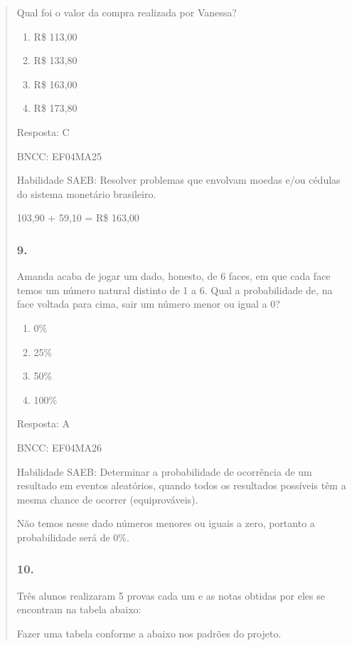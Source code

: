 \begin{enumerate}
\begin{escolha}
\begin{enumerate}
\begin{itemize}
\begin{itemize}
\begin{escolha}
\begin{quote}
\begin{escolha}
{Qual foi o valor da compra realizada por Vanessa?

\begin{enumerate}
\def\labelenumi{\alph{enumi})}
\item
  R\$ 113,00
\item
  R\$ 133,80
\item
  R\$ 163,00
\item
  R\$ 173,80
\end{enumerate}

Resposta: C

BNCC: EF04MA25

Habilidade SAEB: Resolver problemas que envolvam moedas e/ou cédulas do
sistema monetário brasileiro.

103,90 + 59,10 = R\$ 163,00

\subsubsection{9.}\label{section-165}

Amanda acaba de jogar um dado, honesto, de 6 faces, em que cada face
temos um número natural distinto de 1 a 6. Qual a probabilidade de, na
face voltada para cima, sair um número menor ou igual a 0?

\begin{enumerate}
\def\labelenumi{\alph{enumi})}
\item
  0\%
\item
  25\%
\item
  50\%
\item
  100\%
\end{enumerate}

Resposta: A

BNCC: EF04MA26

Habilidade SAEB: Determinar a probabilidade de ocorrência de um
resultado em eventos aleatórios, quando todos os resultados possíveis
têm a mesma chance de ocorrer (equiprováveis).

Não temos nesse dado números menores ou iguais a zero, portanto a
probabilidade será de 0\%.

\subsubsection{10.}\label{section-166}

Três alunos realizaram 5 provas cada um e as notas obtidas por eles se
encontram na tabela abaixo:

Fazer uma tabela conforme a abaixo nos padrões do projeto.

}
\end{escolha}
\end{quote}
\end{escolha}
\end{itemize}
\end{itemize}
\end{enumerate}
\end{escolha}
\end{enumerate}
